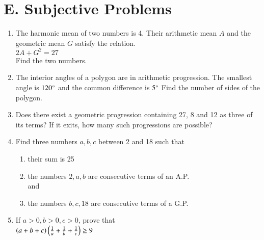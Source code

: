 \documentclass[journal]{IEEEtran}
\theoremstyle{remark}
\begin{document}
\section*{E. Subjective Problems}
\begin{enumerate}
    \item The harmonic mean of two numbers is 4. Their arithmetic mean $A$ and the geometric mean $G$ satisfy the relation.
    \\
    $2A + G^2 = 27$
    \\
    Find the two numbers.  \hfill{}

\item The interior angles of a polygon are in arithmetic progression. The smallest angle is $120\degree$ and the common difference is $5\degree$ Find the number of sides of the polygon. \hfill{}

    \item Does there exist a geometric progression containing 27, 8 and 12 as three of its terms? If it exits, how many such progressions are possible?  \hfill{}

    \item Find three numbers $a,b,c$ between 2 and 18 such that
    \begin{enumerate}
    \item their sum is 25
    \item the numbers $2,a,b$ are consecutive terms of an A.P.
    \\
    and
    \item the numbers $b,c,18$ are consecutive terms of a G.P.\hfill{}
    \end{enumerate}
  

    \item If $a>0,b>0,c>0$, prove that
    \\
    $\left(a+b+c\right)\left(\frac{1}{a}+\frac{1}{b}+\frac{1}{c}\right)\geq9$
    \hfill{}

\end{enumerate}
\end{document}
